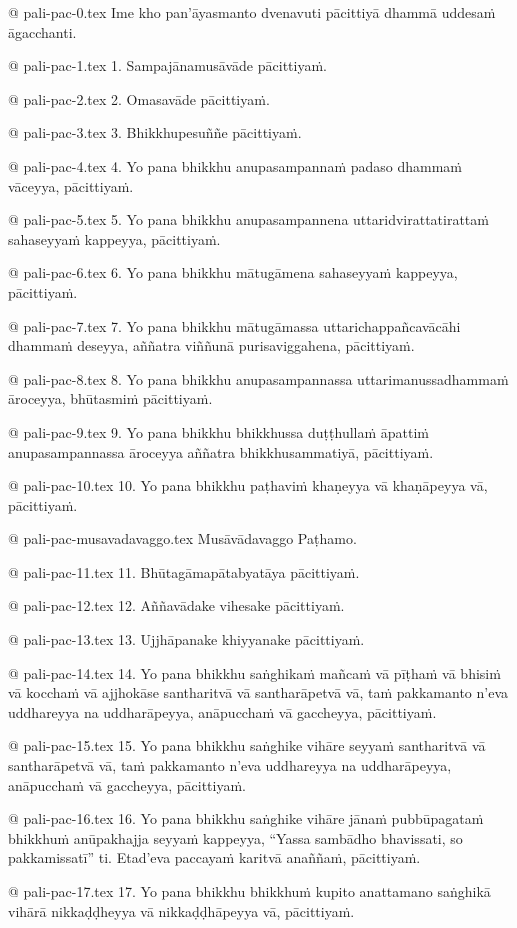 @ pali-pac-0.tex
Ime kho pan’āyasmanto dvenavuti pācittiyā dhammā uddesaṁ āgacchanti.

@ pali-pac-1.tex
1. Sampajānamusāvāde pācittiyaṁ.

@ pali-pac-2.tex
2. Omasavāde pācittiyaṁ.

@ pali-pac-3.tex
3. Bhikkhupesuññe pācittiyaṁ.

@ pali-pac-4.tex
4. Yo pana bhikkhu anupasampannaṁ padaso dhammaṁ vāceyya, pācittiyaṁ.

@ pali-pac-5.tex
5. Yo pana bhikkhu anupasampannena uttaridvirattatirattaṁ sahaseyyaṁ kappeyya, pācittiyaṁ.

@ pali-pac-6.tex
6. Yo pana bhikkhu mātugāmena sahaseyyaṁ kappeyya, pācittiyaṁ.

@ pali-pac-7.tex
7. Yo pana bhikkhu mātugāmassa uttarichappañcavācāhi dhammaṁ deseyya, aññatra viññunā purisaviggahena, pācittiyaṁ.

@ pali-pac-8.tex
8. Yo pana bhikkhu anupasampannassa uttarimanussadhammaṁ āroceyya, bhūtasmiṁ pācittiyaṁ.

@ pali-pac-9.tex
9. Yo pana bhikkhu bhikkhussa duṭṭhullaṁ āpattiṁ anupasampannassa āroceyya aññatra bhikkhusammatiyā, pācittiyaṁ.

@ pali-pac-10.tex
10. Yo pana bhikkhu paṭhaviṁ khaṇeyya vā khaṇāpeyya vā, pācittiyaṁ.

@ pali-pac-musavadavaggo.tex
Musāvādavaggo Paṭhamo.

@ pali-pac-11.tex
11. Bhūtagāmapātabyatāya pācittiyaṁ.

@ pali-pac-12.tex
12. Aññavādake vihesake pācittiyaṁ.

@ pali-pac-13.tex
13. Ujjhāpanake khiyyanake pācittiyaṁ.

@ pali-pac-14.tex
14. Yo pana bhikkhu saṅghikaṁ mañcaṁ vā pīṭhaṁ vā bhisiṁ vā kocchaṁ vā ajjhokāse santharitvā vā santharāpetvā vā, taṁ pakkamanto n’eva uddhareyya na uddharāpeyya, anāpucchaṁ vā gaccheyya, pācittiyaṁ.

@ pali-pac-15.tex
15. Yo pana bhikkhu saṅghike vihāre seyyaṁ santharitvā vā santharāpetvā vā, taṁ pakkamanto n’eva uddhareyya na uddharāpeyya, anāpucchaṁ vā gaccheyya, pācittiyaṁ.

@ pali-pac-16.tex
16. Yo pana bhikkhu saṅghike vihāre jānaṁ pubbūpagataṁ bhikkhuṁ anūpakhajja seyyaṁ kappeyya, “Yassa sambādho bhavissati, so pakkamissatī” ti. Etad’eva paccayaṁ karitvā anaññaṁ, pācittiyaṁ.

@ pali-pac-17.tex
17. Yo pana bhikkhu bhikkhuṁ kupito anattamano saṅghikā vihārā nikkaḍḍheyya vā nikkaḍḍhāpeyya vā, pācittiyaṁ.

